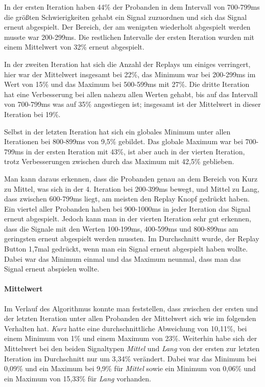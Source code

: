 In der ersten Iteration haben 44\% der Probanden in dem Intervall von 700-799ms die gr{\"o}{\ss}ten Schwierigkeiten gehabt ein Signal zuzuordnen und sich das Signal erneut abgespielt. 
Der Bereich, der am wenigsten wiederholt abgespielt werden musste war 200-299ms. 
Die restlichen Intervalle der ersten Iteration wurden mit einem Mittelwert von 32\% erneut abgespielt.

In der zweiten Iteration hat sich die Anzahl der Replays um einiges verringert, hier war der Mittelwert insgesamt bei 22\%, das Minimum war bei 200-299ms im Wert von 15\% und das Maximum bei 500-599ms mit 27\%.  
Die dritte Iteration hat eine Verbesserung bei allen nahezu allen Werten gehabt, bis auf das Intervall von 700-799ms was auf 35\% angestiegen ist; insgesamt ist der Mittelwert in dieser Iteration bei 19\%. 

Selbst in der letzten Iteration hat sich ein globales Minimum unter allen Iterationen bei 800-899ms von 9,5\% gebildet. Das globale Maximum war bei 700-799ms in der ersten Iteration mit 43\%, ist aber auch in der vierten Iteration, trotz Verbesserungen zwischen durch das Maximum mit 42,5\% geblieben. 

Man kann daraus erkennen, dass die Probanden genau an dem Bereich von Kurz zu Mittel, was sich in der 4. Iteration bei 200-399ms bewegt, und Mittel zu Lang, dass zwischen 600-799ms liegt, am meisten den Replay Knopf gedr{\"u}ckt haben. 
Ein viertel aller Probanden haben bei 900-1000ms in jeder Iteration das Signal erneut abgespielt. 
Jedoch kann man in der vierten Iteration sehr gut erkennen, dass die Signale mit den Werten 100-199ms, 400-599ms und 800-899ms am geringsten erneut abgespielt werden mussten.
Im Durchschnitt wurde, der Replay Button 1,7mal gedr{\"u}ckt, wenn man ein Signal erneut abgespielt haben wollte. 
Dabei war das Minimum einmal und das Maximum neunmal, dass man das Signal erneut abspielen wollte.

\paragraph{Mittelwert}
Im Verlauf des Algorithmus konnte man feststellen, dass zwischen der ersten und der letzten Iteration unter allen Probanden der Mittelwert sich wie im folgenden Verhalten hat. 
\textit{Kurz} hatte eine durchschnittliche Abweichung von 10,11\%, bei einem Minimum von 1\% und einem Maximum von 23\%. 
Weiterhin habe sich der Mittelwert bei den beiden Signaltypen \textit{Mittel} und \textit{Lang} von der ersten zur letzten Iteration im Durchschnitt nur um 3,34\% ver{\"a}ndert.
Dabei war das Minimum bei 0,09\% und ein Maximum bei 9,9\% f{\"u}r \textit{Mittel} sowie ein Minimum von 0,06\% und ein Maximum von 15,33\% f{\"u}r \textit{Lang} vorhanden.

